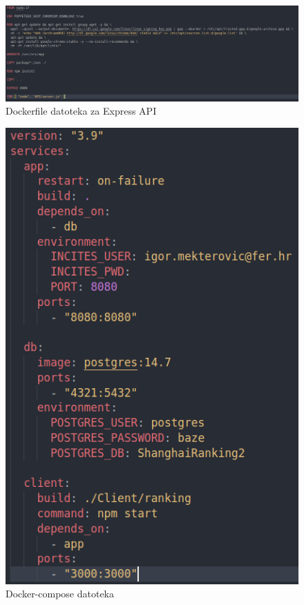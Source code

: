 \documentclass[times, utf8, zavrsni]{fer}
\begin{document}
\begin{figure}[htb]
    \hspace*{-2cm}
       \includegraphics[scale=0.33]{dockerfile.png} 
       \caption{Dockerfile datoteka za Express API}
       \label{fig:docker1}
       \end{figure}
\begin{figure}[htb]
        \centering
           \includegraphics[scale=0.3]{docker2.png} 
           \caption{Docker-compose datoteka}
           \label{fig:docker2}
           \end{figure}       
           
\end{document}

